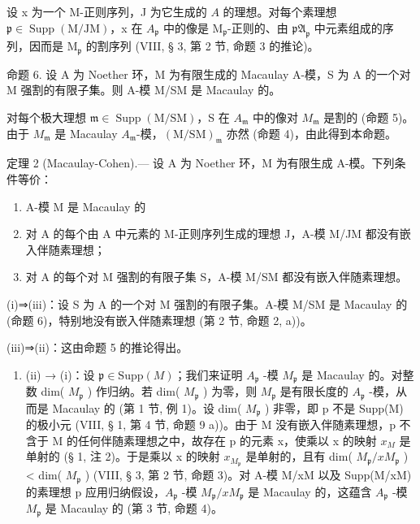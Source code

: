 设 x 为一个 M-正则序列，J 为它生成的 \(A\) 的理想。对每个素理想 \(\mathfrak{p} \in \operatorname{Supp}(\mathrm{M/JM})\)，x 在 \(A_{\mathfrak{p}}\) 中的像是 \(\mathrm{M}_{\mathfrak{p}}\)-正则的、由 \(\mathfrak{pA}_{\mathfrak{p}}\) 中元素组成的序列，因而是 \(\mathrm{M}_{\mathfrak{p}}\) 的割序列 (VIII, § 3, 第 2 节, 命题 3 的推论)。

命题 6. 设 A 为 Noether 环，M 为有限生成的 Macaulay A-模，S 为 A 的一个对 M 强割的有限子集。则 A-模 M/SM 是 Macaulay 的。

对每个极大理想 \(\mathfrak{m} \in \operatorname{Supp}(\mathrm{M} / \mathrm{SM})\)，S 在 \(A_{\mathfrak{m}}\) 中的像对 \(M_{\mathfrak{m}}\) 是割的 (命题 5)。由于 \(M_{\mathfrak{m}}\) 是 Macaulay \(A_{\mathfrak{m}}\)-模，\((\mathrm{M} / \mathrm{SM})_{\mathfrak{m}}\) 亦然 (命题 4)，由此得到本命题。

定理 2 (Macaulay-Cohen).--- 设 A 为 Noether 环，M 为有限生成 A-模。下列条件等价：

\begin{enumerate}
\def\labelenumi{(\roman{enumi})}
\item
  A-模 M 是 Macaulay 的
\item
  对 A 的每个由 A 中元素的 M-正则序列生成的理想 J，A-模 M/JM 都没有嵌入伴随素理想；
\item
  对 A 的每个对 M 强割的有限子集 S，A-模 M/SM 都没有嵌入伴随素理想。
\end{enumerate}

(i)⇒(iii)：设 S 为 A 的一个对 M 强割的有限子集。A-模 M/SM 是 Macaulay 的 (命题 6)，特别地没有嵌入伴随素理想 (第 2 节, 命题 2, a))。

(iii)⇒(ii)：这由命题 5 的推论得出。

\begin{enumerate}
\def\labelenumi{(\roman{enumi})}
\setcounter{enumi}{1}
\tightlist
\item
  (ii) → (i)：设 \(\mathfrak{p} \in \text{Supp}(M)\)；我们来证明 \(A_{\mathfrak{p}}\) -模 \(M_{\mathfrak{p}}\) 是 Macaulay 的。对整数 dim( \(M_{\mathfrak{p}}\) ) 作归纳。若 dim( \(M_{\mathfrak{p}}\) ) 为零，则 \(M_{\mathfrak{p}}\) 是有限长度的 \(A_{\mathfrak{p}}\) -模，从而是 Macaulay 的 (第 1 节, 例 1)。设 dim( \(M_{\mathfrak{p}}\) ) 非零，即 p 不是 Supp(M) 的极小元 (VIII, § 1, 第 4 节, 命题 9 a))。由于 M 没有嵌入伴随素理想，p 不含于 M 的任何伴随素理想之中，故存在 p 的元素 x，使乘以 x 的映射 \(x_{M}\) 是单射的 (§ 1, 注 2)。于是乘以 x 的映射 \(x_{M_{\mathfrak{p}}}\) 是单射的，且有 dim( \(M_{\mathfrak{p}}/xM_{\mathfrak{p}}\) ) \textless{} dim( \(M_{\mathfrak{p}}\) ) (VIII, § 3, 第 2 节, 命题 3)。对 A-模 M/xM 以及 Supp(M/xM) 的素理想 p 应用归纳假设，\(A_{\mathfrak{p}}\) -模 \(M_{\mathfrak{p}}/xM_{\mathfrak{p}}\) 是 Macaulay 的，这蕴含 \(A_{\mathfrak{p}}\) -模 \(M_{\mathfrak{p}}\) 是 Macaulay 的 (第 3 节, 命题 4)。
\end{enumerate}

